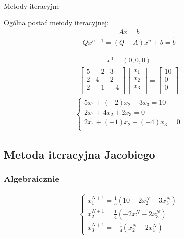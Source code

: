 \documentclass[12pt]{article}
\begin{document}
    \hfill \\
    \begin{center}{\large Metody iteracyjne}\end{center}
    Ogólna postać metody iteracyjnej:
    \begin{align*}
        Ax = b
    \end{align*}
    \begin{align*}
        Qx^{n+1} = (Q - A)x^n + b = \tilde{b}
    \end{align*}

    \begin{align*}
        x^0 = (0,0,0)
    \end{align*}
    \begin{align*}
        \begin{bmatrix}
            5 & -2 & 3\\
            2 & 4 & 2\\
            2 & -1 & -4\\
        \end{bmatrix}
        \begin{bmatrix}
            x_1\\
            x_2\\
            x_3\\
        \end{bmatrix}
        =
        \begin{bmatrix}
            10\\
            0\\
            0\\
        \end{bmatrix}
    \end{align*}
    \begin{align*}
        \left\{\begin{matrix}
                   5x_1 + (-2)x_2 + 3x_3 = 10\\
                   2x_1 + 4x_2 + 2x_3 = 0\\
                   2x_1 + (-1)x_2 + (-4)x_3 = 0\\
        \end{matrix}\right.
    \end{align*}

    \subsection{Metoda iteracyjna Jacobiego}

    \subsubsection{Algebraicznie}
    \begin{align*}
        \left\{\begin{matrix}
                   x^{N+1}_1 = \frac{1}{5}(10 + 2x^N_2 - 3x^N_3)\\
                   x^{N+1}_2 = \frac{1}{4}(-2x^N_1 - 2x^N_3)\\
                   x^{N+1}_3 = -\frac{1}{4}(x^N_2 - 2x^N_1)
        \end{matrix}\right.
    \end{align*}
\end{document}
